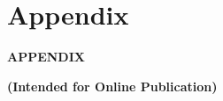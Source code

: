 \documentclass[11pt, a4paper, draft]{article} %
\begin{document}
\newpage





\newpage
\TODO\section{Appendix}
\vspace*{\fill}
{\Huge \begin{center}\textbf{APPENDIX}\end{center}}
{\huge\begin{center}\textbf{(Intended for Online Publication)}\end{center}}
\vspace*{\fill}\clearpage
\end{document}
